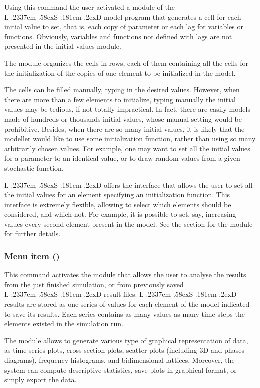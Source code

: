 \documentclass [11pt,a4paper] {book}
\def\LsD{{L\kern-.2337em\lower-.58ex\hbox{S}\kern-.181em\lower-.2ex\hbox{D}}\xspace}
\begin{document}
Using this command the user activated a module of the \LsD model program that generates a cell for each initial value to set, that is, each copy of parameter or each lag for variables or functions. Obviously, variables and functions not defined with lags are not presented in the initial values module.

The module organizes the cells in rows, each of them containing all the cells for the initialization of the copies of one element to be initialized in the model. 

The cells can be filled manually, typing in the desired values. However, when there are more than a few elements to initialize, typing manually the initial values may be tedious, if not totally impractical. In fact, there are easily models made of hundreds or thousands initial values, whose manual setting would be prohibitive. Besides, when there are so many initial values, it is likely that the modeller would like to use some initialization function, rather than using so many arbitrarily chosen values. For example, one may want to set all the initial values for a parameter to an identical value, or to draw random values from a given stochastic function. 

\LsD offers the  interface that allows the user to set all the initial values for an element specifying an initialization function. This interface is extremely flexible, allowing to select which elements should be considered, and which not. For example, it is possible to set, say, increasing values every second element present in the model. See the section for the module  for further details.



\subsubsection{Menu item  ()}

This command activates the module  that allows the user to analyse the results from the just finished simulation, or from previously saved \LsD result files. \LsD results are stored as one series of values for each element of the model indicated to save its results. Each series contains as many values as many time steps the elements existed in the simulation run. 

The module allows to generate various type of graphical representation of data, as time series plots, cross-section plots, scatter plots (including 3D and phases diagrams), frequency histograms, and bidimensional lattices. Moreover, the system can compute descriptive statistics, save plots in graphical format, or simply export the data.
\end{document}
